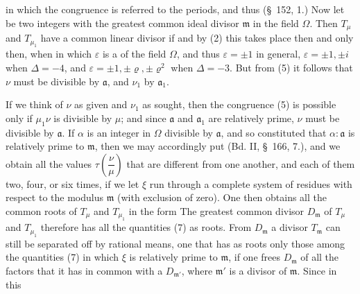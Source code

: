 in which the congruence is referred to the periods, and thus (\S\ 152, 1.)
Now let
be two integers with the greatest common ideal divisor $\mathfrak{m}$ in the field $\Omega$. Then $T_\mu$ and $T_{\mu_1}$ have a common linear divisor if
and by (2) this takes place then and only then, when
in which $\varepsilon$ is a  of the field $\Omega$, and thus $\varepsilon = \pm 1$ in general, $\varepsilon = \pm 1, \pm i$ when $\Delta = -4$, and $\varepsilon = \pm 1, \pm\varrho, \pm\varrho^2$ when $\Delta = -3$. But from (5) it follows that $\nu$ must be divisible by $\mathfrak{a}$, and $\nu_1$ by $\mathfrak{a}_1$.

If we think of $\nu$ as given and $\nu_1$ as sought, then the congruence (5) is possible only if $\mu_1\nu$ is divisible by $\mu$; and since $\mathfrak{a}$ and $\mathfrak{a}_1$ are relatively prime, $\nu$ must be divisible by $\mathfrak{a}$. If $\alpha$ is an integer in $\Omega$ divisible by $\mathfrak{a}$, and so constituted that $\alpha : \mathfrak{a}$ is relatively prime to $\mathfrak{m}$, then we may accordingly put
(Bd. II, \S\ 166, 7.), and we obtain all the values $\tau\left(\dfrac{\nu}{\mu}\right)$ that are different from one another, and each of them two, four, or six times, if we let $\xi$ run through a complete system of residues with respect to the modulus $\mathfrak{m}$ (with exclusion of zero). One then obtains all the common roots of $T_\mu$ and $T_{\mu_1}$ in the form
The greatest common divisor $D_{\mathfrak m}$ of $T_\mu$ and $T_{\mu_1}$ therefore has all the quantities (7) as roots. From $D_{\mathfrak m}$ a divisor $T_{\mathfrak m}$ can still be separated off by rational means, one that has as roots only those among the quantities (7) in which $\xi$ is relatively prime to $\mathfrak{m}$, if one frees $D_{\mathfrak m}$ of all the factors that it has in common with a $D_{\mathfrak m'}$, where $\mathfrak{m}'$ is a divisor of $\mathfrak{m}$. Since in this
